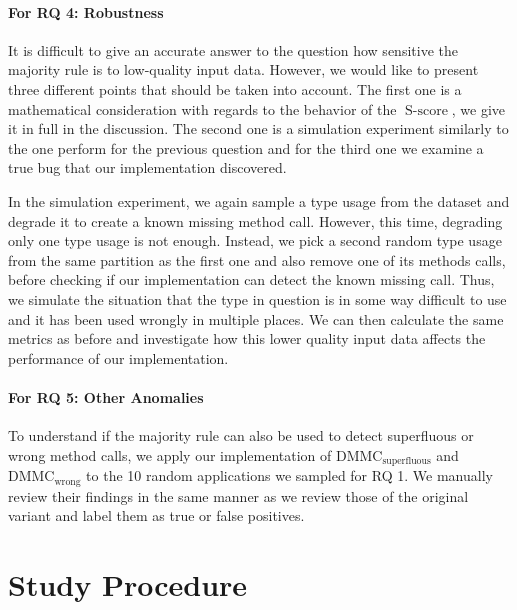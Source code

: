 \paragraph{For RQ 4: Robustness}

It is difficult to give an accurate answer to the question how sensitive the majority rule is to low-quality input data.
However, we would like to present three different points that should be taken into account.
The first one is a mathematical consideration with regards to the behavior of the $\operatorname{S-score}$, we give it in full in the discussion.
The second one is a simulation experiment similarly to the one perform for the previous question and for the third one we examine a true bug that our implementation discovered.

In the simulation experiment, we again sample a type usage from the dataset and degrade it to create a known missing method call.
However, this time, degrading only one type usage is not enough.
Instead, we pick a second random type usage from the same partition as the first one and also remove one of its methods calls, before checking if our implementation can detect the known missing call.
Thus, we simulate the situation that the type in question is in some way difficult to use and it has been used wrongly in multiple places.
We can then calculate the same metrics as before and investigate how this lower quality input data affects the performance of our implementation.

\paragraph{For RQ 5: Other Anomalies}

To understand if the majority rule can also be used to detect superfluous or wrong method calls, we apply our implementation of $\text{DMMC}_\text{superfluous}$ and $\text{DMMC}_\text{wrong}$ to the 10 random applications we sampled for RQ 1.
We manually review their findings in the same manner as we review those of the original variant and label them as true or false positives.

\section{Study Procedure}

